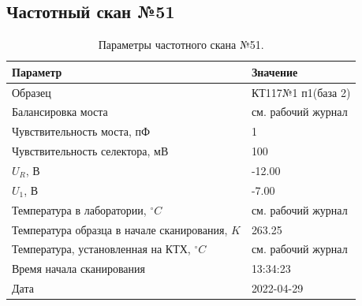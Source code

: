\subsection{Частотный скан №51}
\begin{table}[!ht]
    \centering
    \caption{Параметры частотного скана №51.}
    \begin{tabular}{|l|l|}
        \hline
        Параметр                                       & Значение                  \\ \hline
        Образец                                        & КТ117№1 п1(база 2)        \\ \hline
        Балансировка моста                             & см. рабочий журнал        \\ \hline
        Чувствительность моста, пФ                     & 1                         \\ \hline
        Чувствительность селектора, мВ                 & 100                       \\ \hline
        $U_R$, В                                       & -12.00                    \\ \hline
        $U_1$, В                                       & -7.00                     \\ \hline
        Температура в лаборатории, $^\circ C$          & см. рабочий журнал        \\ \hline
        Температура образца в начале сканирования, $K$ & 263.25                    \\ \hline
        Температура, установленная на КТХ, $^\circ C$  & см. рабочий журнал        \\ \hline
        Время начала сканирования                      & 13:34:23                  \\ \hline
        Дата                                           & 2022-04-29                \\ \hline
    \end{tabular}
    \label{table:frequency_scan_51}
\end{table}

